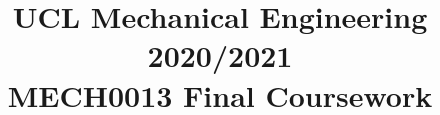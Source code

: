 \documentclass[11pt]{article}
\begin{document}
\title{\textbf{UCL Mechanical Engineering 2020/2021}\\MECH0013 Final Coursework}
\maketitle
\end{document}
